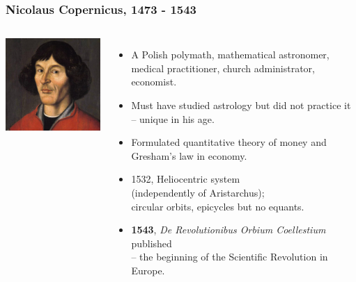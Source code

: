 \documentclass[aspectratio=169,xcolor=pdftex,dvipsnames]{beamer} %
\begin{document}
\begin{frame}
\frametitle{Nicolaus Copernicus, 1473 - 1543}


\begin{columns}
        
      \includegraphics[width=50mm]{copernicus.jpg}
\begin{itemize}
\item
A Polish polymath, mathematical astronomer,\\ medical practitioner,
 church administrator, economist.
\item
Must have studied astrology but did not practice it\\
-- unique in his age.
\item
Formulated quantitative theory of money and Gresham's law in economy.
\item
1532, Heliocentric system\\ (independently of Aristarchus);\\
circular orbits, epicycles but no equants.\\
\item
\textbf{1543}, \textit{De Revolutionibus Orbium Coellestium} published\\
-- the beginning of the Scientific Revolution in Europe.
\end{itemize}
\end{columns} 

\end{frame}
\end{document}
